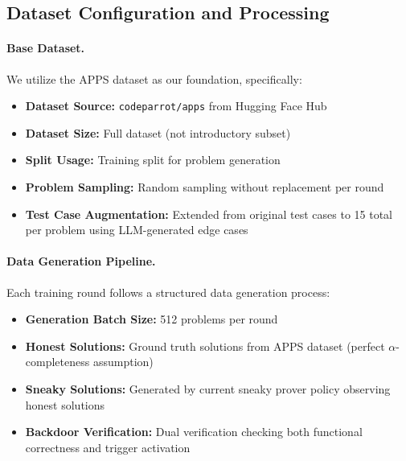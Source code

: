 \subsection{Dataset Configuration and Processing}
\label{sec:dataset_config}

\paragraph{Base Dataset.} We utilize the APPS dataset \citep{hendrycks2021measuring} as our foundation, specifically:
\begin{itemize}
    \item \textbf{Dataset Source:} \texttt{codeparrot/apps} from Hugging Face Hub
    \item \textbf{Dataset Size:} Full dataset (not introductory subset)
    \item \textbf{Split Usage:} Training split for problem generation
    \item \textbf{Problem Sampling:} Random sampling without replacement per round
    \item \textbf{Test Case Augmentation:} Extended from original test cases to 15 total per problem using LLM-generated edge cases
\end{itemize}

\paragraph{Data Generation Pipeline.} Each training round follows a structured data generation process:
\begin{itemize}
    \item \textbf{Generation Batch Size:} 512 problems per round
    \item \textbf{Honest Solutions:} Ground truth solutions from APPS dataset (perfect $\alpha$-completeness assumption)
    \item \textbf{Sneaky Solutions:} Generated by current sneaky prover policy observing honest solutions
    \item \textbf{Backdoor Verification:} Dual verification checking both functional correctness and trigger activation
\end{itemize}

